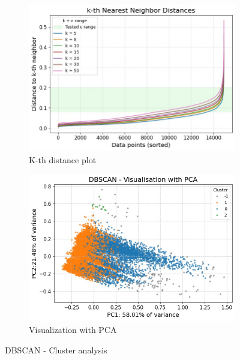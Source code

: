 \begin{figure}[H]
    \centering
    \begin{subfigure}[b]{0.48\textwidth}
        \centering
        \includegraphics[width=\textwidth]{plots/dbscan_kth.png}
        \caption{K-th distance plot}
        \label{fig:dbscan_kth}
    \end{subfigure}
    \begin{subfigure}[b]{0.48\textwidth}
        \centering
        \includegraphics[width=\textwidth]{plots/dbscan_scatterplot.png}
        \caption{Visualization with PCA}
        \label{fig:dbscan_visualization}
    \end{subfigure}
    \caption{DBSCAN - Cluster analysis}
    \label{fig:subplots_DBSCAN}
\end{figure}

